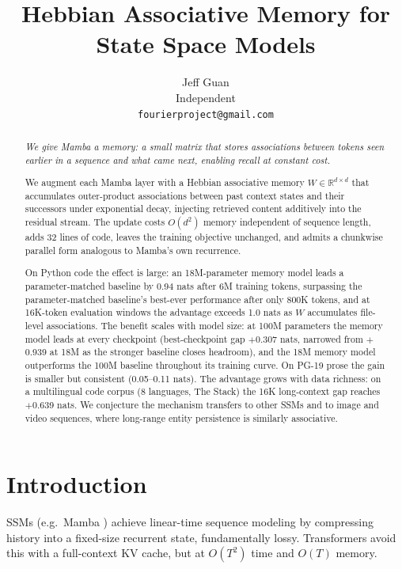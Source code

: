 \documentclass{article}
\title{Hebbian Associative Memory for State Space Models}
\author{
  Jeff Guan \\
  Independent \\
  \texttt{fourierproject@gmail.com}
}
\begin{document}
\maketitle

\begin{abstract}
\textit{We give Mamba a memory: a small matrix that stores associations between tokens seen earlier in a sequence and what came next, enabling recall at constant cost.}

We augment each Mamba layer with a Hebbian associative memory $W \in \mathbb{R}^{d \times d}$ that accumulates outer-product associations between past context states and their successors under exponential decay, injecting retrieved content additively into the residual stream. The update costs $O(d^2)$ memory independent of sequence length, adds 32 lines of code, leaves the training objective unchanged, and admits a chunkwise parallel form analogous to Mamba's own recurrence.

On Python code the effect is large: an 18M-parameter memory model leads a parameter-matched baseline by 0.94 nats after 6M training tokens, surpassing the parameter-matched baseline's best-ever performance after only 800K tokens, and at 16K-token evaluation windows the advantage exceeds 1.0 nats as $W$ accumulates file-level associations. The benefit scales with model size: at 100M parameters the memory model leads at every checkpoint (best-checkpoint gap $+$0.307 nats, narrowed from $+$0.939 at 18M as the stronger baseline closes headroom), and the 18M memory model outperforms the 100M baseline throughout its training curve. On PG-19 prose the gain is smaller but consistent (0.05--0.11 nats). The advantage grows with data richness: on a multilingual code corpus (8 languages, The Stack) the 16K long-context gap reaches $+$0.639 nats. We conjecture the mechanism transfers to other SSMs and to image and video sequences, where long-range entity persistence is similarly associative.
\end{abstract}

\section{Introduction}

SSMs (e.g.\ Mamba \citep{gu2023mamba}) achieve linear-time sequence modeling by compressing history into a fixed-size recurrent state, fundamentally lossy. Transformers avoid this with a full-context KV cache, but at $O(T^2)$ time and $O(T)$ memory.
\end{document}
